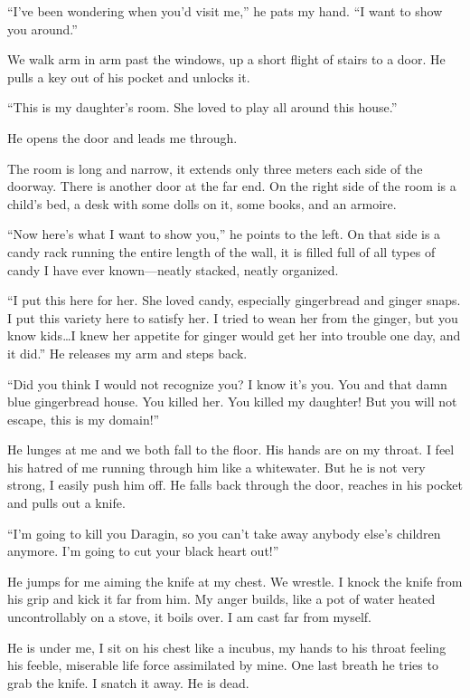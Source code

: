 ``I've been wondering when you'd visit me,'' he pats my hand. ``I want
to show you around.''

We walk arm in arm past the windows, up a short flight of stairs to a
door. He pulls a key out of his pocket and unlocks it.

``This is my daughter's room. She loved to play all around this house.''

He opens the door and leads me through.

The room is long and narrow, it extends only three meters each side of
the doorway. There is another door at the far end. On the right side of
the room is a child's bed, a desk with some dolls on it, some books, and
an armoire.

``Now here's what I want to show you,'' he points to the left. On that
side is a candy rack running the entire length of the wall, it is filled
full of all types of candy I have ever known---neatly stacked, neatly
organized.

``I put this here for her. She loved candy, especially gingerbread and
ginger snaps. I put this variety here to satisfy her. I tried to wean
her from the ginger, but you know kids\ldots I knew her appetite for
ginger would get her into trouble one day, and it did.'' He releases my
arm and steps back.

``Did you think I would not recognize you? I know it's you. You and that
damn blue gingerbread house. You killed her. You killed my daughter! But
you will not escape, this is my domain!''

He lunges at me and we both fall to the floor. His hands are on my
throat. I feel his hatred of me running through him like a whitewater.
But he is not very strong, I easily push him off. He falls back through
the door, reaches in his pocket and pulls out a knife.

``I'm going to kill you Daragin, so you can't take away anybody else's
children anymore. I'm going to cut your black heart out!''

He jumps for me aiming the knife at my chest. We wrestle. I knock the
knife from his grip and kick it far from him. My anger builds, like a
pot of water heated uncontrollably on a stove, it boils over. I am cast
far from myself.

He is under me, I sit on his chest like a incubus, my hands to his
throat feeling his feeble, miserable life force assimilated by mine. One
last breath he tries to grab the knife. I snatch it away. He is dead.

